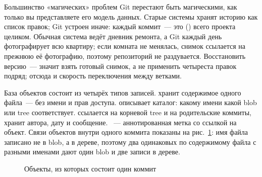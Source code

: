Большинство «магических» проблем Git перестают быть магическими, как только вы представляете его модель данных. Старые системы хранят историю как список правок; Git устроен иначе: каждый коммит~--- это  () всего проекта целиком. Обычная система ведёт дневник ремонта, а Git каждый день фотографирует всю квартиру; если комната не менялась, снимок ссылается на прежнюю её фотографию, поэтому репозиторий не раздувается. Восстановить версию~--- значит взять готовый снимок, а не применить четыреста правок подряд; отсюда и скорость переключения между ветками.

База объектов состоит из четырёх типов записей.  хранит содержимое одного файла~--- без имени и прав доступа.  описывает каталог: какому имени какой blob или tree соответствует.  ссылается на корневой tree и на родительские коммиты, хранит автора, дату и сообщение. ~--- аннотированная метка со ссылкой на объект. Связи объектов внутри одного коммита показаны на рис.~\ref{fig:12-1}: имя файла записано не в blob, а в дереве, поэтому два одинаковых по содержимому файла с разными именами дают один blob и две записи в дереве.

\begin{figure}[htbp]\centering
{}
\caption{Объекты, из которых состоит один коммит}\label{fig:12-1}
\end{figure}

